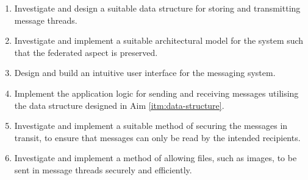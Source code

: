 \begin{enumerate}
  \item \label{itm:data-structure} Investigate and design a suitable data structure for storing and transmitting message threads.
  \item Investigate and implement a suitable architectural model for the system such that the federated aspect is preserved.
  \item Design and build an intuitive user interface for the messaging system.
  \item Implement the application logic for sending and receiving messages utilising the data structure designed in Aim \ref{itm:data-structure}.
  \item Investigate and implement a suitable method of securing the messages in transit, to ensure that messages can only be read by the intended recipients.
  \item Investigate and implement a method of allowing files, such as images, to be sent in message threads securely and efficiently.
\end{enumerate}